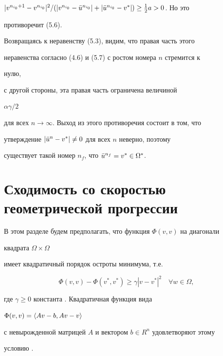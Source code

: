 \begin{pf}
$|v^{n_{i_0}+1}-v^{n_{i_0}}|^2/(|v^{n_{i_0}}-\Bar u^{n_{i_0}}|+


|\Bar u^{n_{i_0}}-v^*|)\ge\frac{1}{2}a>0$. Но это


противоречит (5.6).





Возвращаясь к неравенству (5.3), видим, что правая часть этого


неравенства согласно (4.6) и (5.7) с ростом номера $n$ стремится к


нулю,


с другой стороны, эта правая часть ограничена величиной


$\alpha\gamma/2$


для всех $n\to\infty$. Выход из этого противоречия состоит в том, что


утверждение $|\Bar u^n-v^*|\ne 0$ для всех $n$ неверно, поэтому


существует такой номер $n_f$, что $\Bar u^{n_f}=v^*\in\Omega^*$.


\end{pf}





\section{Сходимость со скоростью геометрической прогрессии}





В этом разделе будем предполагать, что функция $\Phi(v,v)$ на диагонали


квадрата $\Omega\times\Omega$


имеет квадратичный порядок остроты минимума, т.е.


\begin{equation}


\Phi(v,v)-\Phi(v^*,v^*)\ge \gamma|v-v^*|^2\quad


\forall w\in \Omega,


\end{equation}


где $\gamma\ge 0$ константа \cite{Pol}. Квадратичная функция вида


$\Phi(v,v)=\langle Av-b,Av-v\rangle$


с невырожденной матрицей $A$ и вектором $b\in R^n$ удовлетворяют этому


условию \cite{A1}.





